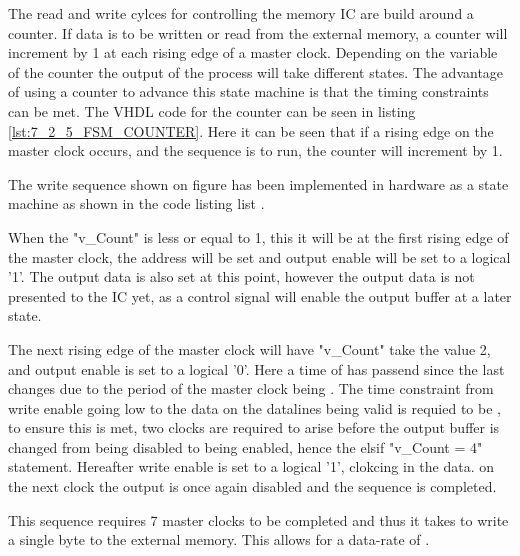The read and write cylces for controlling the memory IC are build around a counter. If data is to be written or read from the external memory, a counter will increment by 1 at each rising edge of a  master clock. Depending on the variable of the counter the output of the process will take different states. The advantage of using a counter to advance this state machine is that the timing constraints can be met. The VHDL code for the counter can be seen in listing \ref{lst:7_2_5_FSM_COUNTER}. Here it can be seen that if a rising edge on the master clock occurs, and the sequence is to run, the counter will increment by 1.



The write sequence shown on figure  has been implemented in hardware as a state machine as shown in the code listing list .



When the "v\_Count" is less or equal to 1, this it will be at the first rising edge of the master clock, the address will be set and output enable will be set to a logical '1'. The output data is also set at this point, however the output data is not presented to the IC yet, as a control signal will enable the output buffer at a later state. 

The next rising edge of the master clock will have "v\_Count" take the value 2, and output enable is set to a logical '0'. Here a time of  has passend since the last changes due to the period of the master clock being . The time constraint from write enable going low to the data on the datalines being valid is requied to be , to ensure this is met, two clocks are required to arise before the output buffer is changed from being disabled to being enabled, hence the elsif "v\_Count = 4" statement. Hereafter write enable is set to a logical '1', clokcing in the data. on the next clock the output is once again disabled and the sequence is completed. 

This sequence requires 7 master clocks to be completed and thus it takes  to write a single byte to the external memory. This allows for a data-rate of .

